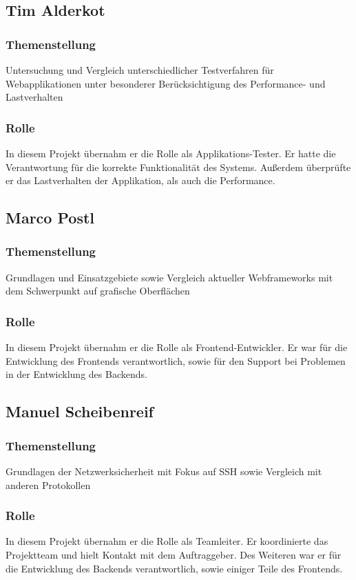 \subsection{Tim Alderkot}
\subsubsection{Themenstellung}
Untersuchung und Vergleich unterschiedlicher Testverfahren für Webapplikationen unter besonderer Berücksichtigung des Performance- und Lastverhalten
\subsubsection{Rolle}
In diesem Projekt übernahm er die Rolle als Applikations-Tester. Er hatte die Verantwortung für die korrekte Funktionalität des Systems. Außerdem überprüfte er das Lastverhalten der Applikation, als auch die Performance.

\subsection{Marco Postl}
\subsubsection{Themenstellung}
Grundlagen und Einsatzgebiete sowie Vergleich aktueller Webframeworks mit dem Schwerpunkt auf grafische Oberflächen
\subsubsection{Rolle}
In diesem Projekt übernahm er die Rolle als Frontend-Entwickler. Er war für die Entwicklung des Frontends verantwortlich, sowie für den Support bei Problemen in der Entwicklung des Backends.

\subsection{Manuel Scheibenreif}
\subsubsection{Themenstellung}
Grundlagen der Netzwerksicherheit mit Fokus auf SSH sowie Vergleich mit anderen Protokollen
\subsubsection{Rolle}
In diesem Projekt übernahm er die Rolle als Teamleiter. Er koordinierte das Projektteam und hielt Kontakt mit dem Auftraggeber. Des Weiteren war er für die Entwicklung des Backends verantwortlich, sowie einiger Teile des Frontends. 

